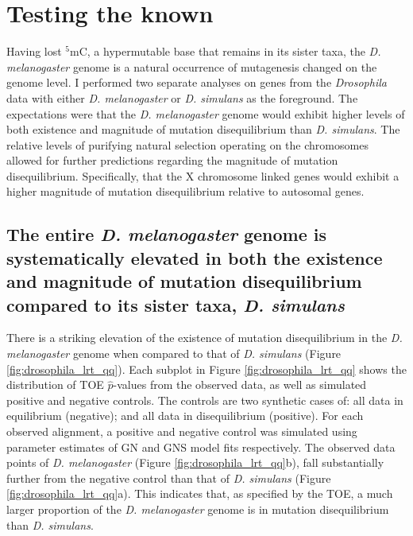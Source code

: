 

\section{Testing the known}

Having lost $^5$mC, a hypermutable base that remains in its sister taxa, the \textit{D. melanogaster} genome is a natural occurrence of mutagenesis changed on the genome level. I performed two separate analyses on genes from the \textit{Drosophila} data with either \textit{D. melanogaster} or \textit{D. simulans} as the foreground. The expectations were that the \textit{D. melanogaster} genome would exhibit higher levels of both existence and magnitude of mutation disequilibrium than \textit{D. simulans}. The relative levels of purifying natural selection operating on the chromosomes allowed for further predictions regarding the magnitude of mutation disequilibrium. Specifically, that the X chromosome linked genes would exhibit a higher magnitude of mutation disequilibrium relative to autosomal genes. 

\subsection{The entire \textit{D. melanogaster} genome is systematically elevated in both the existence and magnitude of mutation disequilibrium compared to its sister taxa, \textit{D. simulans}}
\label{TOE_drosophila}

There is a striking elevation of the existence of mutation disequilibrium in the \textit{D. melanogaster} genome when compared to that of \textit{D. simulans} (Figure \ref{fig:drosophila_lrt_qq}). Each subplot in Figure \ref{fig:drosophila_lrt_qq} shows the distribution of TOE $\hat p$-values from the observed data, as well as simulated positive and negative controls. The controls are two synthetic cases of: all data in equilibrium (negative); and all data in disequilibrium (positive). For each observed alignment, a positive and negative control was simulated using parameter estimates of GN and GNS model fits respectively. The observed data points of \textit{D. melanogaster} (Figure \ref{fig:drosophila_lrt_qq}b), fall substantially further from the negative control than that of \textit{D. simulans} (Figure \ref{fig:drosophila_lrt_qq}a). This indicates that, as specified by the TOE, a much larger proportion of the \textit{D. melanogaster} genome is in mutation disequilibrium than \textit{D. simulans}. 

